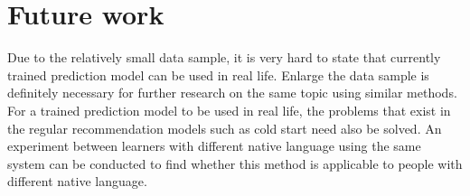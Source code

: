 \section{Future work}

Due to the relatively small data sample, it is very hard to state that currently trained prediction model can be used in real life. Enlarge the data sample is definitely necessary for further research on the same topic using similar methods. For a trained prediction model to be used in real life, the problems that exist in the regular recommendation models such as cold start need also be solved. An experiment between learners with different native language using the same system can be conducted to find whether this method is applicable to people with different native language. 
